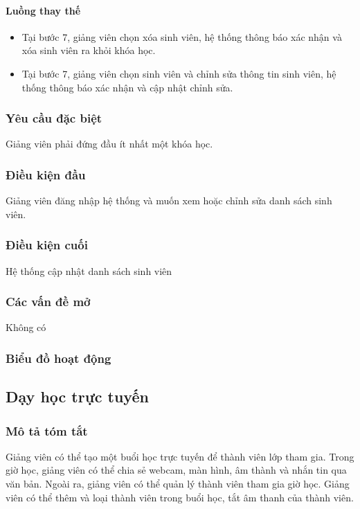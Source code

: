 \documentclass[./../main_file.tex]{subfiles}
\begin{document}
\paragraph{Luồng thay thế}
\begin{itemize}
\item Tại bước 7, giảng viên chọn xóa sinh viên, hệ thống thông báo xác nhận và xóa sinh viên ra khỏi khóa học.
\item Tại bước 7, giảng viên chọn sinh viên và chỉnh sửa thông tin sinh viên, hệ thống thông báo xác nhận và cập nhật chỉnh sửa.
\end{itemize}
\subsubsection{Yêu cầu đặc biệt}
Giảng viên phải đứng đầu ít nhất một khóa học.

\subsubsection{Điều kiện đầu}
Giảng viên đăng nhập hệ thống và muốn xem hoặc chỉnh sửa danh sách sinh viên.

\subsubsection{Điều kiện cuối}
Hệ thống cập nhật danh sách sinh viên

\subsubsection{Các vấn đề mở}
Không có

\subsubsection{Biểu đồ hoạt động}

\subsection{Dạy học trực tuyến}
\subsubsection{Mô tả tóm tắt}
Giảng viên có thể tạo một buổi học trực tuyến để thành viên lớp tham gia. Trong giờ học, giảng viên có thể chia sẻ webcam, màn hình, âm thành và nhắn tin qua văn bản. Ngoài ra, giảng viên có thể quản lý thành viên tham gia giờ học. Giảng viên có thể thêm và loại thành viên trong buổi học, tắt âm thanh của thành viên.
\end{document}
